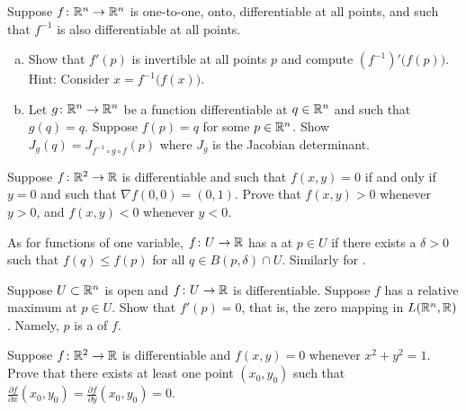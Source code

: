 \begin{samepage}
\begin{exercise}
Suppose $f \colon {\mathbb{R}}^n \to {\mathbb{R}}^n$ is one-to-one, onto, differentiable at all
points, and such that $f^{-1}$ is also differentiable at all points.
\begin{enumerate}[a)]
\item
Show that $f'(p)$ is invertible at all points $p$ and compute
${(f^{-1})}'\bigl(f(p)\bigr)$.  Hint: Consider $x = f^{-1}\bigl(f(x)\bigr)$.
\item
Let $g \colon {\mathbb{R}}^n \to {\mathbb{R}}^n$ be a function differentiable at $q \in {\mathbb{R}}^n$
and such that $g(q)=q$.  Suppose $f(p) = q$ for some $p \in {\mathbb{R}}^n$.
Show $J_g(q) = J_{f^{-1} \circ g \circ f}(p)$ where $J_g$ is the Jacobian
determinant.
\end{enumerate}
\end{exercise}
\end{samepage}

\begin{exercise}
Suppose $f \colon {\mathbb{R}}^2 \to {\mathbb{R}}$ is differentiable and such that
$f(x,y) = 0$ if and only if $y=0$ and such that $\nabla f(0,0) = (0,1)$.
Prove that $f(x,y) > 0$ whenever $y > 0$, and
$f(x,y) < 0$ whenever $y < 0$.
\end{exercise}

\begin{exnote}
\pagebreak[2]
As for functions of one variable, $f \colon U \to {\mathbb{R}}$ has a
\emph{} at $p \in U$ if there exists
a $\delta >0$ such that $f(q) \leq f(p)$ for all $q \in B(p,\delta) \cap U$.
Similarly for \emph{}.
\end{exnote}

\begin{exercise} \label{exercise:mv:maximumcritical}
Suppose $U \subset {\mathbb{R}}^n$ is open and
$f \colon U \to {\mathbb{R}}$ is differentiable.  Suppose $f$ has a relative maximum
at $p \in U$.  Show that $f'(p) = 0$, that is, the zero mapping in
$L({\mathbb{R}}^n,{\mathbb{R}})$.  Namely, $p$ is a
\emph{} of $f$.
\end{exercise}

\begin{exercise}
Suppose $f \colon {\mathbb{R}}^2 \to {\mathbb{R}}$ is differentiable and 
$f(x,y) = 0$ whenever $x^2+y^2 = 1$.
Prove that there exists at least
one point $(x_0,y_0)$ such that
$\frac{\partial f}{\partial x}(x_0,y_0) = \frac{\partial f}{\partial
y}(x_0,y_0) = 0$.
\end{exercise}

